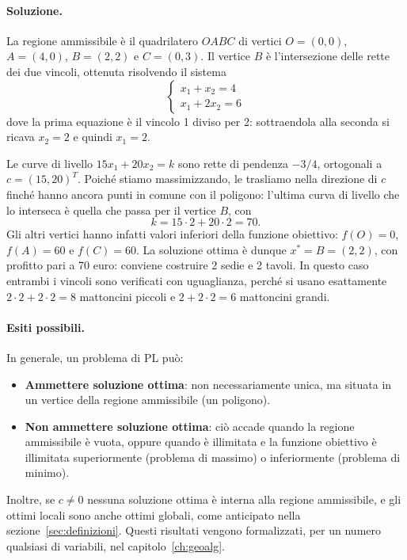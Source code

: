 \paragraph{Soluzione.}
La regione ammissibile è il quadrilatero $OABC$ di vertici $O=(0,0)$, $A=(4,0)$, $B=(2,2)$ e $C=(0,3)$. Il vertice $B$ è l'intersezione delle rette dei due vincoli, ottenuta risolvendo il sistema
\[
\begin{cases}
x_1 + x_2 = 4 \\
x_1 + 2x_2 = 6
\end{cases}
\]
dove la prima equazione è il vincolo 1 diviso per 2: sottraendola alla seconda si ricava $x_2 = 2$ e quindi $x_1 = 2$.

Le curve di livello $15x_1 + 20x_2 = k$ sono rette di pendenza $-3/4$, ortogonali a $c = (15, 20)^T$. Poiché stiamo massimizzando, le trasliamo nella direzione di $c$ finché hanno ancora punti in comune con il poligono: l'ultima curva di livello che lo interseca è quella che passa per il vertice $B$, con
\[
k = 15 \cdot 2 + 20 \cdot 2 = 70.
\]
Gli altri vertici hanno infatti valori inferiori della funzione obiettivo: $f(O) = 0$, $f(A) = 60$ e $f(C) = 60$. La soluzione ottima è dunque $x^* = B = (2,2)$, con profitto pari a 70 euro: conviene costruire 2 sedie e 2 tavoli. In questo caso entrambi i vincoli sono verificati con uguaglianza, perché si usano esattamente $2 \cdot 2 + 2 \cdot 2 = 8$ mattoncini piccoli e $2 + 2 \cdot 2 = 6$ mattoncini grandi.

\paragraph{Esiti possibili.}
In generale, un problema di PL può:
\begin{itemize}
    \item \textbf{Ammettere soluzione ottima}: non necessariamente unica, ma situata in un vertice della regione ammissibile (un poligono).
    \item \textbf{Non ammettere soluzione ottima}: ciò accade quando la regione ammissibile è vuota, oppure quando è illimitata e la funzione obiettivo è illimitata superiormente (problema di massimo) o inferiormente (problema di minimo).
\end{itemize}

Inoltre, se $c \neq 0$ nessuna soluzione ottima è interna alla regione ammissibile, e gli ottimi locali sono anche ottimi globali, come anticipato nella sezione~\ref{sec:definizioni}. Questi risultati vengono formalizzati, per un numero qualsiasi di variabili, nel capitolo~\ref{ch:geoalg}.

